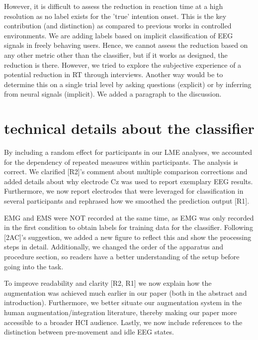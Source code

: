 However, it is difficult to assess the reduction in reaction time at a high resolution as no label exists for the 'true' intention onset. This is the key contribution (and distinction) as compared to previous works in controlled environments. We are adding labels based on implicit classification of EEG signals in freely behaving users. Hence, we cannot assess the reduction based on any other metric other than the classifier, but if it works as designed, the reduction is there. However, we tried to explore the subjective experience of a potential reduction in RT through interviews. Another way would be to determine this on a single trial level by asking questions (explicit) or by inferring from neural signals (implicit). We added a paragraph to the discussion.

\section{technical details about the classifier}

By including a random effect for participants in our LME analyses, we accounted for the dependency of repeated measures within participants. The analysis is correct. We clarified [R2]'s comment about multiple comparison corrections and added details about why electrode Cz was used to report exemplary EEG results. Furthermore, we now report electrodes that were leveraged for classification in several participants and rephrased how we smoothed the prediction output [R1].

EMG and EMS were NOT recorded at the same time, as EMG was only recorded in the first condition to obtain labels for training data for the classifier. Following [2AC]'s suggestion, we added a new figure to reflect this and show the processing steps in detail. Additionally, we changed the order of the apparatus and procedure section, so readers have a better understanding of the setup before going into the task. 

To improve readability and clarity [R2, R1] we now explain how the augmentation was achieved much earlier in our paper (both in the abstract and introduction). Furthermore, we better situate our augmentation system in the human augmentation/integration literature, thereby making our paper more accessible to a broader HCI audience. Lastly, we now include references to the distinction between pre-movement and idle EEG states.

